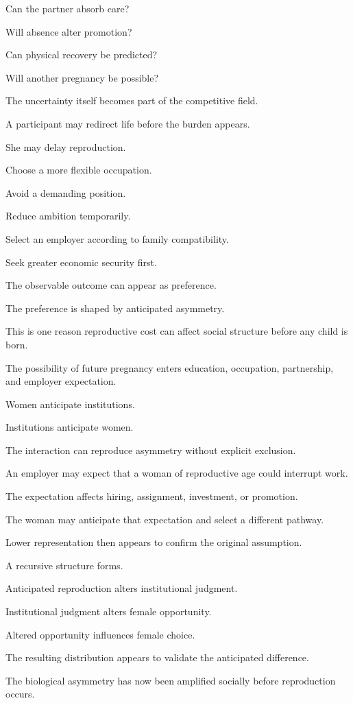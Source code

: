 Can the partner absorb care?

Will absence alter promotion?

Can physical recovery be predicted?

Will another pregnancy be possible?

The uncertainty itself becomes part of the competitive field.

A participant may redirect life before the burden appears.

She may delay reproduction.

Choose a more flexible occupation.

Avoid a demanding position.

Reduce ambition temporarily.

Select an employer according to family compatibility.

Seek greater economic security first.

The observable outcome can appear as preference.

The preference is shaped by anticipated asymmetry.

This is one reason reproductive cost can affect social structure before any child is born.

The possibility of future pregnancy enters education, occupation, partnership, and employer expectation.

Women anticipate institutions.

Institutions anticipate women.

The interaction can reproduce asymmetry without explicit exclusion.

An employer may expect that a woman of reproductive age could interrupt work.

The expectation affects hiring, assignment, investment, or promotion.

The woman may anticipate that expectation and select a different pathway.

Lower representation then appears to confirm the original assumption.

A recursive structure forms.

Anticipated reproduction alters institutional judgment.

Institutional judgment alters female opportunity.

Altered opportunity influences female choice.

The resulting distribution appears to validate the anticipated difference.

The biological asymmetry has now been amplified socially before reproduction occurs.

